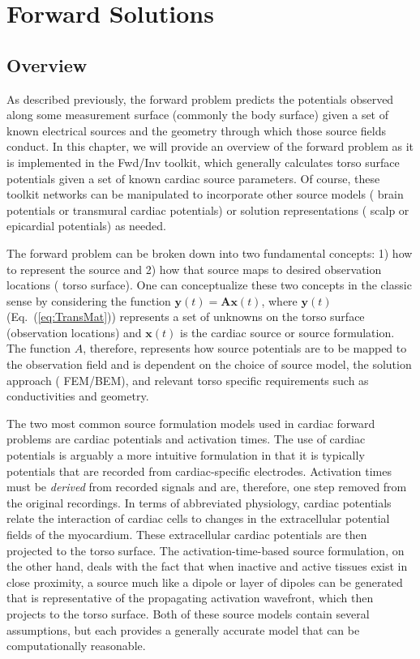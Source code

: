 \chapter{Forward Solutions}\label{ch:fwd}

\section{Overview}

As described previously, the forward problem predicts the potentials observed along some measurement surface (commonly the body surface) given a set of known electrical sources and the geometry through which those source fields conduct. In this chapter, we will provide an overview of the forward problem as it is implemented in the Fwd/Inv toolkit, which generally calculates torso surface potentials given a set of known cardiac source parameters. Of course, these toolkit networks can be manipulated to incorporate other source models (\eg{} brain potentials or transmural cardiac potentials) or solution representations (\eg{} scalp or epicardial potentials) as needed.

The forward problem can be broken down into two fundamental concepts: 1) how to represent the source and 2) how that source maps to desired observation locations (\eg{} torso surface). One can conceptualize these two concepts in the classic sense by considering the function $\mathbf{y}(t) = \mathbf{A}\mathbf{x}(t)$,  where $\mathbf{y}(t)$ (Eq.~(\ref{eq:TransMat})) represents a set of unknowns on the torso surface (observation locations) and $\mathbf{x}(t)$ is the cardiac source or source formulation. The function $A$, therefore, represents how source potentials are to be mapped to the observation field and is dependent on the choice of source model, the solution approach (\ie{} FEM/BEM), and relevant torso specific requirements such as conductivities and geometry.

The two most common source formulation models used in cardiac forward problems are cardiac potentials and activation times. The use of cardiac potentials is arguably a more intuitive formulation in that it is typically potentials that are recorded from cardiac-specific electrodes.  Activation times must be {\em derived} from recorded signals and are, therefore, one step removed from the original recordings.  In terms of abbreviated physiology, cardiac potentials relate the interaction of cardiac cells to changes in the extracellular potential fields of the myocardium. These extracellular cardiac potentials are then projected to the torso surface. The activation-time-based source formulation, on the other hand, deals with the fact that when inactive and active tissues exist in close proximity, a source much like a dipole or layer of dipoles can be generated that is representative of the propagating activation wavefront, which then projects to the torso surface. Both of these source models contain several assumptions, but each provides a generally accurate model that can be computationally reasonable.

